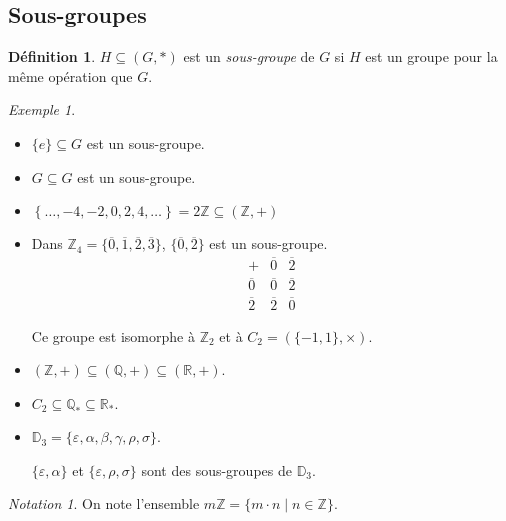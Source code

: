 \documentclass{report}
\newcommand*{\reels}{\mathbb{R}}
\newcommand*{\entiers}{\mathbb{Z}}
\newcommand*{\rationels}{\mathbb{Q}}
\theoremstyle{definition}
\newtheorem*{defin}{D\'efinition}
\theoremstyle{remark}
\newtheorem*{exem}{Exemple}
\newtheorem*{nota}{Notation}
\begin{document}
	\subsection{Sous-groupes}
	\begin{defin}
		$H \subseteq (G,*)$ est un \emph{sous-groupe} de $G$ si $H$ est un groupe pour la m\^eme op\'eration que $G$.
	\end{defin}
	\begin{exem}
		~

		\begin{itemize}
			\item $\{e\} \subseteq G$ est un sous-groupe.
			\item $G \subseteq G$ est un sous-groupe.
			\item $\left\lbrace \dotsc, -4, -2, 0, 2, 4, \dotsc \right\rbrace = 2\entiers \subseteq (\entiers,+)$
			\item Dans $\entiers_4 = \{\overline0, \overline1, \overline2, \overline3\}$, $\{\overline0, \overline2\}$ est un sous-groupe.
			\renewcommand{\arraystretch}{1.5}
			\[
			\begin{array}{c||c|c}
				+&\overline0&\overline2\\
				\hline\hline
				\overline0&\overline0&\overline2\\
				\hline
				\overline2&\overline2&\overline0
			\end{array}
			\]
			\renewcommand{\arraystretch}{1}

			Ce groupe est isomorphe \`a $\entiers_2$ et \`a $C_2=\left( \{-1,1\}, \times \right)$.
			\item $(\entiers,+) \subseteq (\rationels,+) \subseteq (\reels,+)$.
			\item $C_2 \subseteq \rationels_* \subseteq \reels_*$.
			\item $\mathbb{D}_3 = \{\varepsilon, \alpha, \beta, \gamma, \rho, \sigma\}$.

			$\{\varepsilon, \alpha\}$ et $\{\varepsilon, \rho, \sigma\}$ sont des sous-groupes de $\mathbb{D}_3$.
		\end{itemize}
		\begin{nota}
			On note l'ensemble $m\entiers = \{m \cdot n \mid n \in \entiers\}$.
		\end{nota}
	\end{exem}
\end{document}
